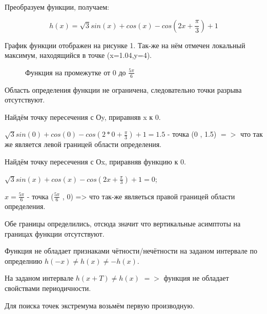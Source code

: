 \documentclass[russian,utf8,nocolumnxxxi,nocolumnxxxii]{eskdtext}
\begin{document}
\begin{enumerate}
\begin{enumerate}
     \end{enumerate}
        
         Преобразуем функции, получаем:
    
    $$h(x) = \sqrt{3}sin(x)+cos(x)-cos(2x+\frac{\pi}{3})+1$$
    
    График функции отображен на рисунке 1. Так-же на нём отмечен локальный максимум, находящийся в точке (x=1.04,y=4).
    
     \begin{figure}[h]
      \centering
      \caption{Функция на промежутке от 0 до $\frac{5\pi}{6}$}
    
   \end{figure}
    
    Область определения функции не ограничена, следовательно точки разрыва отсутствуют.
        
        Найдём точку пересечения с Оy, приравняв x к 0.
        
        $\sqrt{3}sin(0)+cos(0)-cos(2*0+\frac{\pi}{3})+1=1.5$ - точка (0 , 1.5) $=>$ что так же является левой границей области определения.
        
        Найдём точку пересечения с Оx, приравняв функцию к 0.
        
        $\sqrt{3}sin(x)+cos(x)-cos(2x+\frac{\pi}{3})+1=0$;
        
        $x=\frac{5\pi}{6}$ - точка ($\frac{5\pi}{6}$ , 0) => что так-же являеться правой границей области определения.
        
        Обе границы определились, отсюда значит что вертикальные асимптоты на границах функции отсутствуют.
        
        Функция не обладает признаками чётности/нечётности на заданом интервале по определнию $h(-x) \ne h(x) \ne -h(x)$.
        
        На заданом интервале $h(x+T) \ne h(x)$ $=>$ функция не обладает свойствами периодичности.
        
        Для поиска точек экстремума возьмём первую производную.
        

\end{enumerate}
\end{document}
